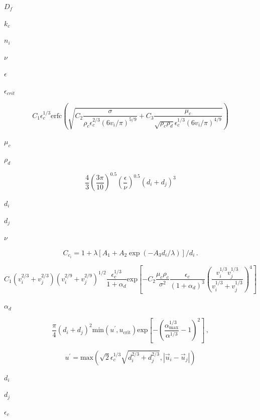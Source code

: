 \documentclass{article}
\begin{document}
$        D_f             $
\pagebreak

$        k_c             $
\pagebreak

$        n_i             $
\pagebreak

$        \nu             $
\pagebreak

$        \epsilon        $
\pagebreak

$        \epsilon_{crit} $
\pagebreak

\[
    C_1 \epsilon_c^{1/3}
    \mathrm{erfc}
    \left(
        \sqrt
        {
            C_2 \frac{\sigma}{\rho_c \epsilon_c^{2/3} (6v_i/\pi)^{5/9}}
          + C_3 \frac{\mu_c}{\sqrt{\rho_c \rho_d}
            \epsilon_c^{1/3} (6v_i/\pi)^{4/9}}
        }
    \right)
\]
\pagebreak

$        \mu_c       $
\pagebreak

$        \rho_d      $
\pagebreak

\[
    \frac{4}{3}\left(\frac{3\pi}{10}\right)^{0.5}
    \left(\frac{\epsilon}{\nu}\right)^{0.5}(d_i+d_j)^3
\]
\pagebreak

$        d_i      $
\pagebreak

$        d_j      $
\pagebreak

$        \nu      $
\pagebreak

\[
    C_{c_i} = 1 + \lambda [A_1 + A_2 \exp(-A_3 d_i/\lambda)]/d_i\,.
\]
\pagebreak

\[
    C_1 (v_i^{2/3} + v_j^{2/3}) (v_i^{2/9} + v_j^{2/9})^{1/2}
    \frac{\epsilon_c^{1/3}}{1 + \alpha_d}
    \text{exp}
    \left[
      - C_2 \frac{\mu_c \rho_c}{\sigma^2}
        \frac{\epsilon_c}{(1 + \alpha_d)^{3}}
        \left(
            \frac{v_i^{1/3} v_j^{1/3}}{v_i^{1/3} + v_j^{1/3}}
        \right)^{4}
    \right]
\]
\pagebreak

$        \alpha_d    $
\pagebreak

\[
    \frac{\pi}{4} (d_i + d_j)^2 \mathrm{min}(u^{\prime}, u_{\mathrm{crit}})
    \mathrm{exp}
    \left[
      - \left(\frac{\alpha_{\mathrm{max}}^{1/3}}{\alpha^{1/3}} - 1\right)^2
    \right]\,,
\]
\pagebreak

\[
    u^{\prime}
  =
    \mathrm{max}
    \left(
        \sqrt{2} \epsilon_c^{1/3} \sqrt{d_i^{2/3} + d_j^{2/3}},
        |\vec{u}_i - \vec{u}_j|
    \right)
\]
\pagebreak

$        d_i          $
\pagebreak

$        d_j          $
\pagebreak

$        \epsilon_c   $
\pagebreak
\end{document}
